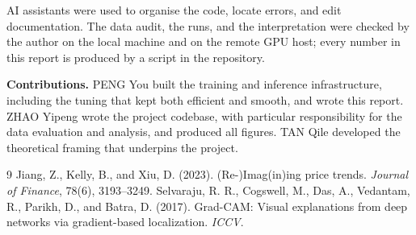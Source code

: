 \documentclass[10pt]{article}
\begin{document}
AI assistants were used to organise the code, locate errors, and edit documentation. The data audit, the runs, and the interpretation were checked by the author on the local machine and on the remote GPU host; every number in this report is produced by a script in the repository.

\textbf{Contributions.} PENG You built the training and inference infrastructure, including the tuning that kept both efficient and smooth, and wrote this report. ZHAO Yipeng wrote the project codebase, with particular responsibility for the data evaluation and analysis, and produced all figures. TAN Qile developed the theoretical framing that underpins the project.

\begin{thebibliography}{9}
 Jiang, Z., Kelly, B., and Xiu, D. (2023). (Re-)Imag(in)ing price trends. \emph{Journal of Finance}, 78(6), 3193--3249.
 Selvaraju, R. R., Cogswell, M., Das, A., Vedantam, R., Parikh, D., and Batra, D. (2017). Grad-CAM: Visual explanations from deep networks via gradient-based localization. \emph{ICCV}.
\end{thebibliography}
\end{document}
